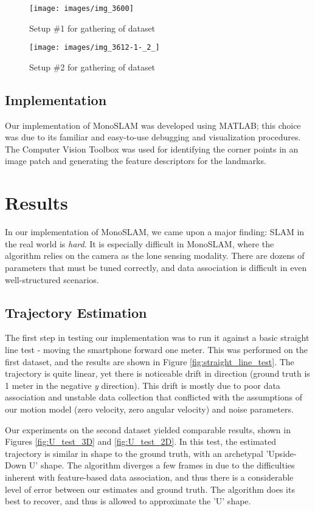 \documentclass[conference]{IEEEtran}
\begin{document}
\begin{figure}[h]
\centering
\texttt{[image: images/img\_3600]}
\caption{Setup \#1 for gathering of dataset}
\label{fig:setup1}
\end{figure}

\begin{figure}[h]
\centering
\texttt{[image: images/img\_3612-1-\_2\_]}
\caption{Setup \#2 for gathering of dataset}
\label{fig:setup2}
\end{figure}

\subsection{Implementation}
Our implementation of MonoSLAM was developed using MATLAB; this choice was due to its familiar and easy-to-use debugging and visualization procedures. The Computer Vision Toolbox was used for identifying the corner points in an image patch and generating the feature descriptors for the landmarks.

\section{Results}
In our implementation of MonoSLAM, we came upon a major finding: SLAM in the real world is \textit{hard}. It is especially difficult in MonoSLAM, where the algorithm relies on the camera as the lone sensing modality. There are dozens of parameters that must be tuned correctly, and data association is difficult in even well-structured scenarios. 

\subsection{Trajectory Estimation}
The first step in testing our implementation was to run it against a basic straight line test - moving the smartphone forward one meter. This was performed on the first dataset, and the results are shown in Figure \ref{fig:straight_line_test}. The trajectory is quite linear, yet there is noticeable drift in direction (ground truth is 1 meter in the negative \textit{y} direction). This drift is mostly due to poor data association and unstable data collection that conflicted with the assumptions of our motion model (zero velocity, zero angular velocity) and noise parameters.

Our experiments on the second dataset yielded comparable results, shown in Figures \ref{fig:U_test_3D} and \ref{fig:U_test_2D}. In this test, the estimated trajectory is similar in shape to the ground truth, with an archetypal 'Upside-Down U' shape. The algorithm diverges a few frames in due to the difficulties inherent with feature-based data association, and thus there is a considerable level of error between our estimates and ground truth. The algorithm does its best to recover, and thus is allowed to approximate the 'U' shape.
\end{document}
